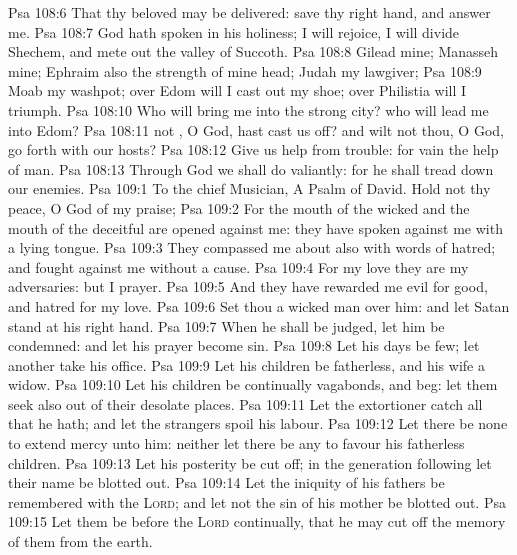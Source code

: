 \vs Psa 108:6 That thy beloved may be delivered: save  thy right hand, and answer me.
\vs Psa 108:7 God hath spoken in his holiness; I will rejoice, I will divide Shechem, and mete out the valley of Succoth.
\vs Psa 108:8 Gilead  mine; Manasseh  mine; Ephraim also  the strength of mine head; Judah  my lawgiver;
\vs Psa 108:9 Moab  my washpot; over Edom will I cast out my shoe; over Philistia will I triumph.
\vs Psa 108:10 Who will bring me into the strong city? who will lead me into Edom?
\vs Psa 108:11  not , O God,  hast cast us off? and wilt not thou, O God, go forth with our hosts?
\vs Psa 108:12 Give us help from trouble: for vain  the help of man.
\vs Psa 108:13 Through God we shall do valiantly: for he  shall tread down our enemies.
\vs Psa 109:1 To the chief Musician, A Psalm of David. Hold not thy peace, O God of my praise;
\vs Psa 109:2 For the mouth of the wicked and the mouth of the deceitful are opened against me: they have spoken against me with a lying tongue.
\vs Psa 109:3 They compassed me about also with words of hatred; and fought against me without a cause.
\vs Psa 109:4 For my love they are my adversaries: but I  prayer.
\vs Psa 109:5 And they have rewarded me evil for good, and hatred for my love.
\vs Psa 109:6 Set thou a wicked man over him: and let Satan stand at his right hand.
\vs Psa 109:7 When he shall be judged, let him be condemned: and let his prayer become sin.
\vs Psa 109:8 Let his days be few;  let another take his office.
\vs Psa 109:9 Let his children be fatherless, and his wife a widow.
\vs Psa 109:10 Let his children be continually vagabonds, and beg: let them seek  also out of their desolate places.
\vs Psa 109:11 Let the extortioner catch all that he hath; and let the strangers spoil his labour.
\vs Psa 109:12 Let there be none to extend mercy unto him: neither let there be any to favour his fatherless children.
\vs Psa 109:13 Let his posterity be cut off;  in the generation following let their name be blotted out.
\vs Psa 109:14 Let the iniquity of his fathers be remembered with the \textsc{Lord}; and let not the sin of his mother be blotted out.
\vs Psa 109:15 Let them be before the \textsc{Lord} continually, that he may cut off the memory of them from the earth.
